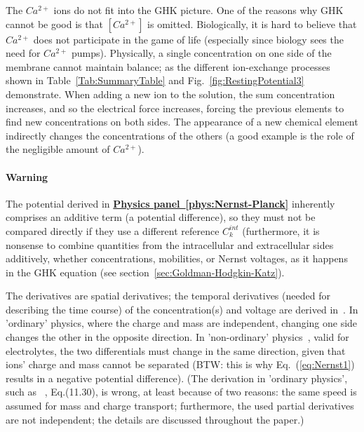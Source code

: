 The $Ca^{2+}$ ions do not fit into the \gls{GHK} picture. 
One of the reasons why \gls{GHK} cannot be good is that $[Ca^{2+}]$
is omitted. Biologically, it is hard to believe that $Ca^{2+}$ does not participate in the game of life (especially since biology sees the need for $Ca^{2+}$ pumps). Physically, a single concentration on one side of the membrane cannot maintain balance; as the different ion-exchange processes shown in Table~\ref{Tab:SummaryTable} and Fig.~\ref{fig:RestingPotential3} demonstrate.
When adding a new ion to the solution, the sum concentration
increases, and so the electrical force increases, forcing the previous 
elements to find new concentrations on both sides.
The appearance of a new chemical element indirectly changes the concentrations of the others (a good example is the role of the negligible amount of $Ca^{2+}$).


{
\paragraph{Warning}

The potential derived in \hyperlink{phys:Nernst-Planck}
{\textbf{Physics panel~\ref{phys:Nernst-Planck}}}
 inherently comprises an additive term (a potential difference), so they must not be compared directly if they use a different reference $C_{k}^{int}$
(furthermore, it is nonsense to combine  quantities from the intracellular and extracellular sides additively,
whether concentrations, mobilities, or Nernst voltages, as it happens in the \gls{GHK} equation (see section~\ref{sec:Goldman-Hodgkin-Katz}).

The derivatives are spatial derivatives; the temporal derivatives (needed for describing the time course) of the concentration(s) and voltage are derived in~\cite{VeghNonOrdinaryLawsForLife:2025}. 
In 'ordinary' physics, where the charge and mass are independent,
changing one side changes the other in the opposite direction.
In 'non-ordinary' physics~\cite{VeghNon-ordinaryLaws:2025}, valid for electrolytes, the two differentials must change in the same direction,
given that ions' charge and mass cannot be separated 
(BTW: this is why Eq.~(\ref{eq:Nernst1}) results in a negative potential difference).
(The derivation in 'ordinary physics', such as ~\cite{KochBiophysics:1999},
Eq.(11.30), is wrong, at least because of two reasons: the same speed is assumed for mass and charge transport; furthermore, the used partial derivatives are not independent; the details are discussed throughout the paper.)
}

